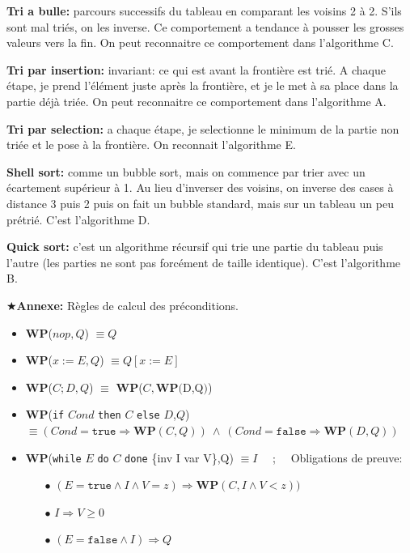 \documentclass[10pt]{article}\usepackage[nu]{esial}
\newcommand{\WP}[1]{\textbf{WP}($#1$)}
\begin{document}
\begin{Reponse}
  \textbf{Tri a bulle:} parcours successifs du tableau en comparant les voisins
  2 à 2. S'ils sont mal triés, on les inverse. Ce comportement a tendance à
  pousser les grosses valeurs vers la fin. On peut reconnaitre ce comportement
  dans l'algorithme C.

  \textbf{Tri par insertion:} invariant: ce qui est avant la frontière est
  trié. A chaque étape, je prend l'élément juste après la frontière, et je le
  met à sa place dans la partie déjà triée. On peut reconnaitre ce comportement
  dans l'algorithme A.

  \textbf{Tri par selection:} a chaque étape, je selectionne le minimum de la
  partie non triée et le pose à la frontière. On reconnait l'algorithme E.

  \textbf{Shell sort:} comme un bubble sort, mais on commence par trier avec un
  écartement supérieur à 1. Au lieu d'inverser des voisins, on inverse des
  cases à distance 3 puis 2 puis on fait un bubble standard, mais sur un
  tableau un peu prétrié. C'est l'algorithme D.

  \textbf{Quick sort:} c'est un algorithme récursif qui trie une partie du
  tableau puis l'autre (les parties ne sont pas forcément de taille
  identique). C'est l'algorithme B.
\end{Reponse}

\bigskip
\noindent\hspace{-1.3em}$\bigstar$\textbf{Annexe:} Règles de calcul des
préconditions. 

\begin{itemize}
\item \WP{nop, Q}  $\equiv Q$
\item \WP{x:=E, Q} $\equiv Q[x:=E]$
\item \WP{C;D, Q}  $\equiv$ \WP{C, \WP{D,Q}}
\item \textbf{WP}(\texttt{if} $Cond$ \texttt{then} $C$ \texttt{else} $D$,$Q$)
  $\equiv (Cond=\mathtt{true}\Rightarrow \mathbf{WP}(C,Q))~\wedge~
          (Cond=\mathtt{false}\Rightarrow \mathbf{WP}(D,Q))$
\item \textbf{WP}(\texttt{while} $E$ \texttt{do} $C$ \texttt{done} \{inv I var
  V\},Q)  $\equiv I$ ~~;~~  Obligations de preuve:
  \begin{enumerate}
  \item[$\bullet$] $(E=\mathtt{true}\wedge I\wedge V=z) \Rightarrow
    \mathbf{WP}(C,I\wedge V<z))$
  \item[$\bullet$] $I\Rightarrow V\geq 0$
  \item[$\bullet$] $(E=\mathtt{false}\wedge I) \Rightarrow Q$
  \end{enumerate}
\end{itemize}
\end{document}

